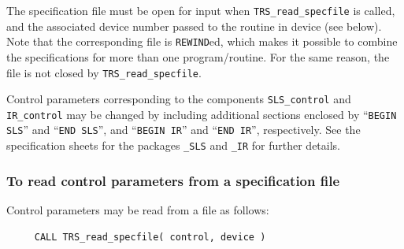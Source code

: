 \documentclass{galahad}
\newcommand{\packagename}{TRS}
\begin{document}
The specification file must be open for
input when {\tt \packagename\_read\_specfile}
is called, and the associated device number
passed to the routine in device (see below).
Note that the corresponding
file is {\tt REWIND}ed, which makes it possible to combine the specifications
for more than one program/routine.  For the same reason, the file is not
closed by {\tt \packagename\_read\_specfile}.

Control parameters corresponding to the components
{\tt SLS\_control}
and
{\tt IR\_control} may be changed by including additional sections enclosed by
``{\tt BEGIN SLS}'' and
``{\tt END SLS}'', and
``{\tt BEGIN IR}'' and
``{\tt END IR}'', respectively.
See the specification sheets for the packages
{\tt \libraryname\_SLS}
and
{\tt \libraryname\_IR}
for further details.

\subsubsection{To read control parameters from a specification file}
\label{readspec}

Control parameters may be read from a file as follows:
\hskip0.5in
\def\baselinestretch{0.8} {\tt \begin{verbatim}
     CALL TRS_read_specfile( control, device )
\end{verbatim}}
\def\baselinestretch{1.0}
\end{document}
